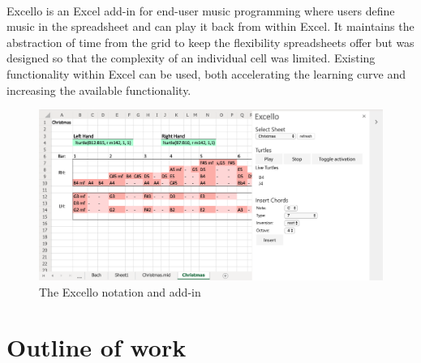 \paragraph{} Excello is an Excel add-in for end-user music programming where users define music in the spreadsheet and can play it back from within Excel. It maintains the abstraction of time from the grid to keep the flexibility spreadsheets offer but was designed so that the complexity of an individual cell was limited. Existing functionality within Excel can be used, both accelerating the learning curve and increasing the available functionality.

\begin{figure}[tbh]
\centerline{\includegraphics[width=150mm]{figs/excello.png}}
\caption{The Excello notation and add-in}
\label{intro:excello}
\end{figure}

\section{Outline of work}

